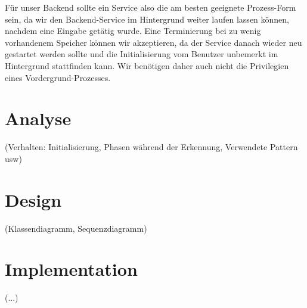 Für unser Backend sollte ein Service also die am besten geeignete Prozess-Form sein, da wir den Backend-Service im Hintergrund weiter laufen lassen können, nachdem eine Eingabe getätig wurde. Eine Terminierung bei zu wenig vorhandenem Speicher können wir akzeptieren, da der Service danach wieder neu gestartet werden sollte und die Initialisierung vom Benutzer unbemerkt im Hintergrund stattfinden kann. Wir benötigen daher auch nicht die Privilegien eines Vordergrund-Prozesses.

\section{Analyse}

(Verhalten: Initialisierung, Phasen während der Erkennung, Verwendete Pattern usw)

\section{Design}

(Klassendiagramm, Sequenzdiagramm)

\section{Implementation}

(...)

